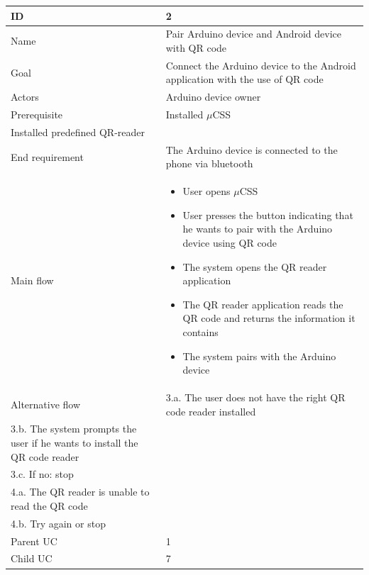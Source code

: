 \begin{table}
    \begin{tabular}{|l|l|}
        \hline
        ID               & 2 \\ \hline
        Name             & Pair Arduino device and Android device with QR code\\ 
        Goal             & Connect the Arduino device to the Android application with the use of QR code\\ 
        Actors           & Arduino device owner\\ 
        Prerequisite     &     Installed $\mu$CSS \\     Installed predefined QR-reader\\ 
        End requirement  & The Arduino device is connected to the phone via bluetooth\\ 
        Main flow        &    
        \begin{itemize}
        \item{User opens $\mu$CSS}
        \item{User presses the button indicating that he wants to pair with the Arduino device using QR code}
        \item{The system opens the QR reader application}
        \item{The QR reader application reads the QR code and returns the information it contains}
        \item{The system pairs with the Arduino device}
        \end{itemize} \\

 
        Alternative flow & 3.a. The user does not have the right QR code reader installed \\ 3.b. The system prompts the user if he wants to install the QR code reader \\ 3.c. If no: stop \\ 4.a. The QR reader is unable to read the QR code \\ 4.b. Try again or stop\\ 
        Parent UC        & 1\\ 
        Child UC         & 7\\
        \hline
    \end{tabular}
\end{table}

